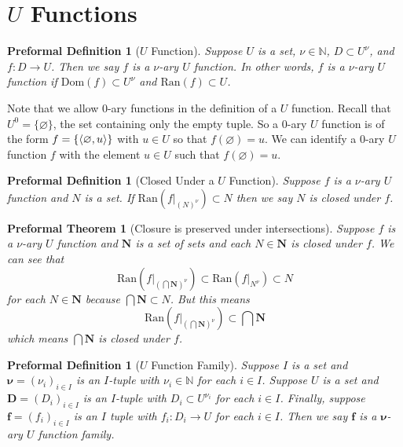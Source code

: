 \documentclass[oneside, 12pt]{book}
\theoremstyle{break}
\newtheorem{preformal definition}[definition]{Preformal Definition}
\newtheorem{preformal theorem}[theorem]{Preformal Theorem}
\newcommand{\bv}[1]{\boldsymbol{#1}}
\newcommand{\N}[0]{\mathbb{N}}
\begin{document}
		\section{$U$ Functions}
		
			\begin{preformal definition}[$U$ Function]
				Suppose $U$ is a set, $\nu\in \N$, $D\subset U^{\nu}$, and $f: D \to U$.
				Then we say $f$ is a $\nu$-ary $U$ function.
				In other words, $f$ is a $\nu$-ary $U$ function if $\text{Dom}(f) \subset U^\nu$ and $\text{Ran}(f) \subset U$.
			\end{preformal definition}
			Note that we allow $0$-ary functions in the definition of a $U$ function.
			Recall that $U^0 = \{\varnothing\}$, the set containing only the empty tuple.
			So a $0$-ary $U$ function is of the form $f = \{\braket{\varnothing, u}\}$ with $u\in U$ so that $f(\varnothing) = u$.
			We can identify a $0$-ary $U$ function $f$ with the element $u\in U$ such that $f(\varnothing) = u$.
			
			\begin{preformal definition}[Closed Under a  $U$ Function]
				Suppose $f$ is a $\nu$-ary $U$ function and $N$ is a set.
				If $\text{Ran}(f|_{(N)^{\nu}}) \subset N$ then we say $N$ is closed under $f$.
			\end{preformal definition}
		
			\begin{preformal theorem}[Closure is preserved under intersections]
				\label{thm:closurepreservedunderintersection}
				Suppose $f$ is a $\nu$-ary $U$ function and $\bv{N}$ is a set of sets and each $N \in \bv{N}$ is closed under $f$.
				We can see that
				\begin{equation*}
					\text{Ran}\left(f|_{\left(\bigcap \bv{N}\right)^{\nu}}\right) \subset \text{Ran}\left(f|_{N^{\nu}}\right) \subset N
				\end{equation*}
				for each $N \in \bv{N}$ because $\bigcap \bv{N} \subset N$.
				But this means
				\begin{equation*}
					\text{Ran}\left(f|_{\left(\bigcap \bv{N}\right)^{\nu}}\right)  \subset \bigcap \bv{N}
				\end{equation*}
				which means $\bigcap \bv{N}$ is closed under $f$.
			\end{preformal theorem}		
		
			\begin{preformal definition}[$U$ Function Family]
				Suppose $I$ is a set and $\bv{\nu} = (\nu_i)_{i\in I}$ is an $I$-tuple with $\nu_i \in \N$ for each $i\in I$.
				Suppose $U$ is a set and $\bv{D} = (D_i)_{i\in I}$ is an $I$-tuple with $D_i \subset U^{\nu_i}$ for each $i\in I$.
				Finally, suppose $\bv{f} = (f_i)_{i\in I}$ is an $I$ tuple with $f_i:D_i \to U$ for each $i\in I$.
				Then we say $\bv{f}$ is a $\bv{\nu}$-ary $U$ function family.
			\end{preformal definition}
			
\end{document}
